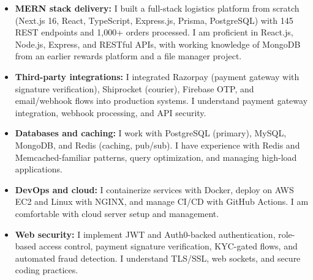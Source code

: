\documentclass[]{cover}
\renewcommand{\closing}[1]{\raggedright\fontspec[Path = OpenFonts/fonts/raleway/]{Raleway-Medium}\fontsize{11pt}{13pt}\selectfont {#1 \\[1pt]}\mbox{}\\ \normalfont}
\renewcommand{\signature}[1]{\raggedright\fontspec[Path = OpenFonts/fonts/raleway/]{Raleway-Medium}\fontsize{11pt}{13pt}\selectfont {#1} \normalfont}
\begin{document}

\currentdate{\today}



{\raggedright{}\fontsize{11pt}{13pt}\selectfont
\renewcommand{\labelitemi}{\textbullet}
\renewcommand{\labelitemii}{\textbullet}
\renewcommand{\labelitemiii}{\textbullet}
\begin{itemize}
    \item \textbf{MERN stack delivery:} I built a full-stack logistics platform from scratch (Next.js 16, React, TypeScript, Express.js, Prisma, PostgreSQL) with 145 REST endpoints and 1,000+ orders processed. I am proficient in React.js, Node.js, Express, and RESTful APIs, with working knowledge of MongoDB from an earlier rewards platform and a file manager project.
    \item \textbf{Third-party integrations:} I integrated Razorpay (payment gateway with signature verification), Shiprocket (courier), Firebase OTP, and email/webhook flows into production systems. I understand payment gateway integration, webhook processing, and API security.
    \item \textbf{Databases and caching:} I work with PostgreSQL (primary), MySQL, MongoDB, and Redis (caching, pub/sub). I have experience with Redis and Memcached-familiar patterns, query optimization, and managing high-load applications.
    \item \textbf{DevOps and cloud:} I containerize services with Docker, deploy on AWS EC2 and Linux with NGINX, and manage CI/CD with GitHub Actions. I am comfortable with cloud server setup and management.
    \item \textbf{Web security:} I implement JWT and Auth0-backed authentication, role-based access control, payment signature verification, KYC-gated flows, and automated fraud detection. I understand TLS/SSL, web sockets, and secure coding practices.
\end{itemize}\par}
\vspace{6pt}


\begin{flushright}
\closing{Kind regards,}

\signature{Gaurav Chaudhary}
\end{flushright}
\end{document}
